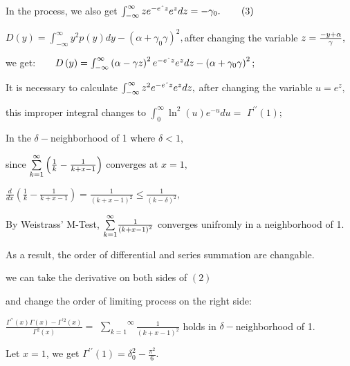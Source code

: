 \documentclass{article}
\begin{document}

In the process, we also get $\int_{-\infty }^{\infty }ze^{-e\symbol{94}%
z}e^{z}dz=-\gamma _{0}.\qquad \left( 3\right) $

$D\left( y\right) =\int_{-\infty }^{\infty }y^{2}p(y)dy-\left( \alpha
+\gamma _{0}\gamma \right) ^{2},$after changing the variable $z=\frac{%
-y+\alpha }{\gamma },$

we get:$\qquad D\left( y\right) =\int_{-\infty }^{\infty }\left( \alpha
-\gamma z\right) ^{2}e^{-e\symbol{94}z}e^{z}dz-\left( \alpha +\gamma
_{0}\gamma \right) ^{2};$

It is necessary to calculate $\int_{-\infty }^{\infty }z^{2}e^{-e\symbol{94}%
z}e^{z}dz,$ after changing the variable $u=e^{z},$

this improper integral changes to $\int_{0}^{\infty }\ln ^{2}\left( u\right)
e^{-u}du=$ $\Gamma ^{\prime \prime }\left( 1\right) ;$

In the $\delta -$neighborhood of 1 where $\delta <1,$

since $\overset{\infty }{\underset{k=1}{\sum }}\left( \frac{1}{k}-\frac{1}{%
k+x-1}\right) $ converges at $x=1,$

$\frac{d}{dx}\left( \frac{1}{k}-\frac{1}{k+x-1}\right) =\frac{1}{\left(
k+x-1\right) ^{2}}\leq \frac{1}{\left( k-\delta \right) ^{2}},$

By Weistrass' M-Test, $\overset{\infty }{\underset{k=1}{\sum }}\frac{1}{%
\left( k+x-1\right) ^{2}}$ converges unifromly in a neighborhood of 1.

As a result, the order of differential and series summation are changable.

we can take the derivative on both sides of $\left( 2\right) $

and change the order of limiting process on the right side:

$\frac{\Gamma ^{\prime \prime }\left( x\right) \Gamma \left( x\right)
-\Gamma ^{\prime 2}\left( x\right) }{\Gamma ^{2}\left( x\right) }=$ $\overset%
{\infty }{\underset{k=1}{\sum }}\frac{1}{\left( k+x-1\right) ^{2}}$ holds in 
$\delta -$neighborhood of 1.

Let $x=1$, we get $\Gamma ^{\prime \prime }\left( 1\right) =\delta _{0}^{2}-%
\frac{\pi ^{2}}{6}.$
\end{document}
